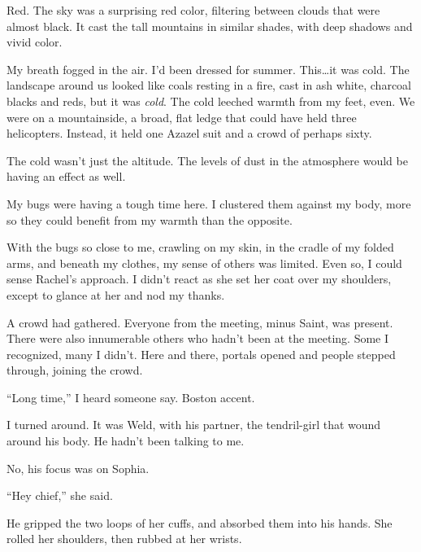 Red.  The sky was a surprising red color, filtering between clouds that were almost black.  It cast the tall mountains in similar shades, with deep shadows and vivid color.



My breath fogged in the air.  I'd been dressed for summer.  This\ldots it was cold.  The landscape around us looked like coals resting in a fire, cast in ash white, charcoal blacks and reds, but it was \emph{cold}.  The cold leeched warmth from my feet, even.  We were on a mountainside, a broad, flat ledge that could have held three helicopters.  Instead, it held one Azazel suit and a crowd of perhaps sixty.



The cold wasn't just the altitude.  The levels of dust in the atmosphere would be having an effect as well.



My bugs were having a tough time here.  I clustered them against my body, more so they could benefit from my warmth than the opposite.



With the bugs so close to me, crawling on my skin, in the cradle of my folded arms, and beneath my clothes, my sense of others was limited.  Even so, I could sense Rachel's approach.  I didn't react as she set her coat over my shoulders, except to glance at her and nod my thanks.



A crowd had gathered.  Everyone from the meeting, minus Saint, was present.  There were also innumerable others who hadn't been at the meeting.  Some I recognized, many I didn't.  Here and there, portals opened and people stepped through, joining the crowd.



``Long time,'' I heard someone say.  Boston accent.



I turned around.  It was Weld, with his partner, the tendril-girl that wound around his body.  He hadn't been talking to me.



No, his focus was on Sophia.



``Hey chief,'' she said.



He gripped the two loops of her cuffs, and absorbed them into his hands.  She rolled her shoulders, then rubbed at her wrists.



